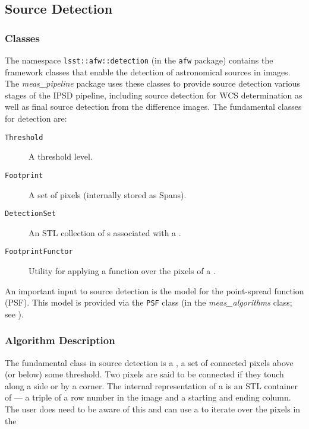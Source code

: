 
\subsection{Source Detection}
\label{secDetection}

\subsubsection{Classes}

The namespace {\tt lsst::afw::detection} (in the {\tt afw} package)
contains the framework classes that enable the detection of
astronomical sources in images.  The {\it meas\_pipeline} package uses
these classes to provide source detection various stages of the IPSD
pipeline, including source detection for WCS determination as well as
final source detection from the difference images.  The fundamental
classes for detection are: 

\begin{description}
    \item[{\tt Threshold}] A threshold level.
    \item[{\tt Footprint}] A set of pixels (internally stored as Spans).
    \item[{\tt DetectionSet}] An STL collection of s associated 
        with a .
    \item[{\tt FootprintFunctor}] Utility for applying a function over the pixels of
        a .
\end{description}

An important input to source detection is the model for the
point-spread function (PSF).  This model is provided via the {\tt PSF}
class (in the {\it meas\_algorithms} class; see ). 

\subsubsection{Algorithm Description}

The fundamental class in source detection is a , a set of 
connected pixels above (or below) some threshold. Two pixels are said to be 
connected if they touch along a side or by a corner. The internal 
representation of a  is an STL container of  --- 
a triple of a row number in the image and a starting and ending column. The 
user does need to be aware of this and can use a  to
iterate over the pixels in the 


